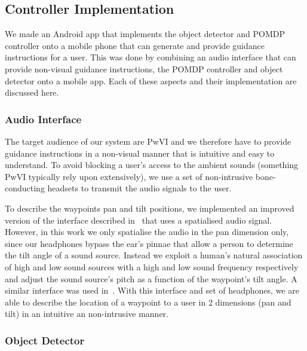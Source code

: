 \documentclass[runningheads]{llncs}
\begin{document}
\subsection{Controller Implementation}

We made an Android app that implements the object detector and POMDP controller onto a mobile phone that can generate and provide guidance instructions for a user.  
This was done by combining an audio interface that can provide non-visual guidance instructions, the POMDP controller and object detector onto a mobile app.
Each of these aspects and their implementation are discussed here.

\subsubsection{Audio Interface}

The target audience of our system are PwVI and we therefore have to provide guidance instructions in a non-visual manner that is intuitive and easy to understand. 
To avoid blocking a user's access to the ambient sounds (something PwVI typically rely upon extensively), we use a set of non-intrusive bone-conducting headsets to transmit the audio signals to the user. 

To describe the waypoints pan and tilt positions, we implemented an improved version of the interface described in~\cite{bellotto2013} that uses a spatialised audio signal.
However, in this work we only spatialise the audio in the pan dimension only, since our headphones bypass the ear's pinnae that allow a person to determine the tilt angle of a sound source. 
Instead we exploit a human's natural association of high and low sound sources with a high and low sound frequency respectively~\cite{blauert1997spatial} and adjust the sound source's pitch as a function of the waypoint's tilt angle. 
A similar interface was used in~\cite{schauerte2012assistive}.
With this interface and set of headphones, we are able to describe the location of a waypoint to a user in 2 dimensions (pan and tilt) in an intuitive an non-intrusive manner. 

\subsubsection{Object Detector}
\end{document}

